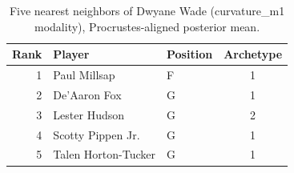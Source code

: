 \begin{table}[htbp]
  \centering\small
  \begin{tabular}{rllc}
    \toprule
    Rank & Player & Position & Archetype \\
    \midrule
    1 & Paul Millsap & F & 1 \\
    2 & De'Aaron Fox & G & 1 \\
    3 & Lester Hudson & G & 2 \\
    4 & Scotty Pippen Jr. & G & 1 \\
    5 & Talen Horton-Tucker & G & 1 \\
    \bottomrule
  \end{tabular}
  \caption{Five nearest neighbors of Dwyane Wade (curvature_m1 modality), Procrustes-aligned posterior mean.}
  \label{tab:Dwyane_Wade_neighbors_curvature_m1}
\end{table}


